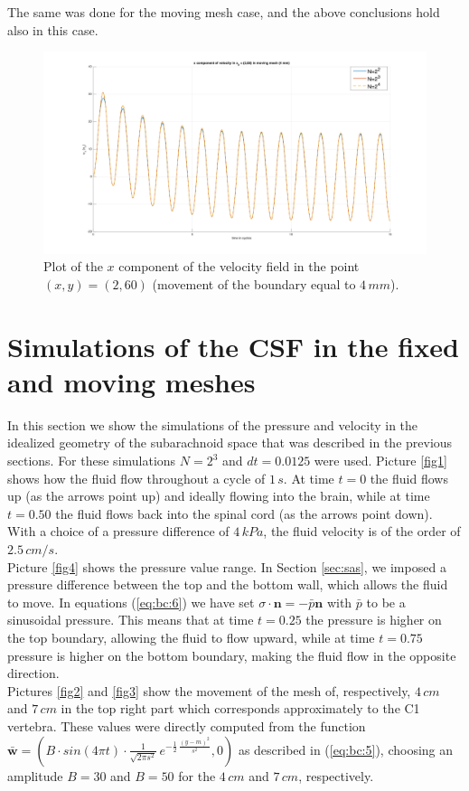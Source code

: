 \documentclass[a4paper,11pt,oneside]{book}
\begin{document}
The same was done for the moving mesh case, and the above conclusions hold also in this case.

\begin{figure}[h!]
\centering
\includegraphics[width=\textwidth]{images/mesh_refinement_ampl.png}
\caption{Plot of the $x$ component of the velocity field in the point $(x,y)=(2,60)$ (movement of the boundary equal to $4 \, mm$).}
\label{img:sas:2}
\end{figure}

\section{Simulations of the CSF in the fixed and moving meshes}
In this section we show the simulations of the pressure and velocity in the idealized geometry of the subarachnoid space that was described in the previous sections. For these simulations $N = 2^3$ and $dt = 0.0125$ were used. Picture \ref{fig1} shows how the fluid flow throughout a cycle of $1 \, s$. At time $t = 0$ the fluid flows up (as the arrows point up) and ideally flowing into the brain, while at time $t = 0.50$ the fluid flows back into the spinal cord (as the arrows point down). With a choice of a pressure difference of $4 \, kPa$, the fluid velocity is of the order of $2.5 \, cm/s$. \\

Picture \ref{fig4} shows the pressure value range. In Section \ref{sec:sas}, we imposed a pressure difference between the top and the bottom wall, which allows the fluid to move. In equations (\ref{eq:bc:6}) we have set $\sigma \cdot \mathbf{n} = -\bar{p}  \mathbf{n}$ with $\bar{p}$ to be a sinusoidal pressure. This means that at time $t=0.25$ the pressure is higher on the top boundary, allowing the fluid to flow upward, while at time $t=0.75$ pressure is higher on the bottom boundary, making the fluid flow in the opposite direction. 
\\
Pictures \ref{fig2} and \ref{fig3} show the movement of the mesh of, respectively, $4 \, cm$ and $7 \, cm$ in the top right part which corresponds approximately to the C1 vertebra. These values were directly computed from the function $\bar{\mathbf{w}} = (B \cdot sin(4\pi t) \cdot \frac{1}{\sqrt{2 \pi s^2}} \, e^{- \frac{1}{2} \, \frac{(y - m)^2}{s^2}}  , 0)$ as described in (\ref{eq:bc:5}), choosing an amplitude $B = 30$ and $B = 50$ for the $4 \, cm$ and $7 \, cm$, respectively.
\end{document}
